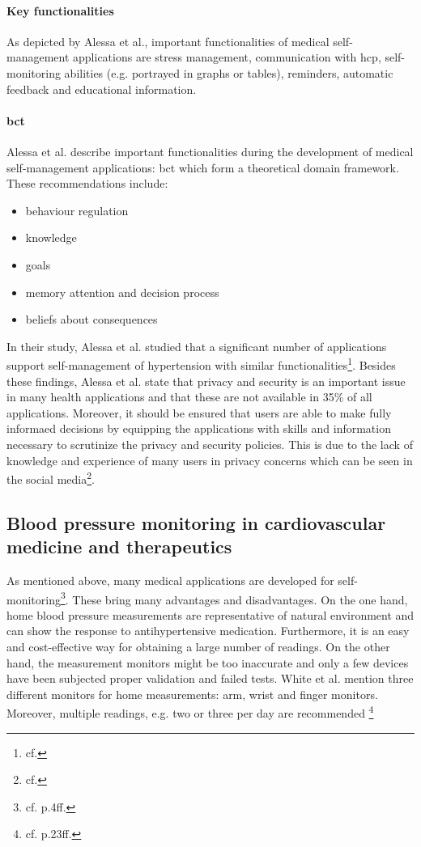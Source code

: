 \paragraph{Key functionalities}
As depicted by Alessa et al., important functionalities of medical self-management applications are stress management, communication with \ac{hcp}, self-monitoring abilities (e.g. portrayed in graphs or tables), reminders, automatic feedback and educational information.
\paragraph{\ac{bct}}
Alessa et al. describe important functionalities during the development of medical self-management applications: \ac{bct} which form a theoretical domain framework. These recommendations include:

\begin{itemize}
\setlength\itemsep{-0.5em}
  \item behaviour regulation
  \item knowledge 
  \item goals
  \item memory attention and decision process
  \item beliefs about consequences
\end{itemize}

In their study, Alessa et al. studied that a significant number of applications support self-management of hypertension with similar functionalities\footnote{cf.\autocite{alessa}}.
Besides these findings, Alessa et al. state that privacy and security is an important issue in many health applications and that these are not available in 35\% of all applications. Moreover, it should be ensured that users are able to make fully informaed decisions by equipping the applications with skills and information necessary to scrutinize the privacy and security policies. This is due to the lack of knowledge and experience of many users in privacy concerns which can be seen in the social media\footnote{cf.\autocite{alessa}}.

\subsection{Blood pressure monitoring in cardiovascular medicine and therapeutics}
As mentioned above, many medical applications are developed for self-monitoring\footnote{cf. p.4ff.\autocite{white_blood_2007}}. These bring many advantages and disadvantages. On the one hand, home blood pressure measurements are representative of natural environment and can show the response to antihypertensive medication. Furthermore, it is an easy and cost-effective way for obtaining a large number of readings. 
On the other hand, the measurement monitors might be too inaccurate and only a few devices have been subjected proper validation and failed tests.
White et al. mention three different monitors for home measurements: arm, wrist and finger monitors. Moreover, multiple readings, e.g. two or three per day are recommended \footnote{cf. p.23ff.\autocite{white_blood_2007}}

